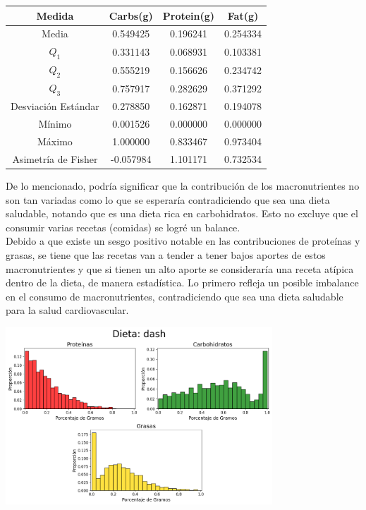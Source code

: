 \documentclass[12pt,a4paper]{article}
\begin{document}
            \begin{center}
                \begin{tabular}{| c | c c c |}
                    \toprule
                    Medida & Carbs(g) & Protein(g) & Fat(g) \\
                    \midrule
                    Media               & 0.549425 & 0.196241 & 0.254334  \\
                    $Q_1$               & 0.331143 & 0.068931 & 0.103381  \\
                    $Q_2$               & 0.555219 & 0.156626 & 0.234742  \\
                    $Q_3$               & 0.757917 & 0.282629 &	0.371292  \\
                    Desviación Estándar & 0.278850 & 0.162871 & 0.194078  \\
                    Mínimo              & 0.001526 & 0.000000 & 0.000000  \\
                    Máximo              & 1.000000 & 0.833467 & 0.973404  \\
                    Asimetría de Fisher & -0.057984 & 1.101171 & 0.732534  \\
                    \bottomrule
                \end{tabular}
            \end{center}

            De lo mencionado, podría significar que la contribución de los macronutrientes 
            no son tan variadas como lo que se esperaría contradiciendo que sea una 
            dieta saludable, notando que es una dieta rica en carbohidratos. Esto no 
            excluye que el consumir varias recetas (comidas) se logré un balance.\\

            Debido a que existe un sesgo positivo notable en las contribuciones de 
            proteínas y grasas, se tiene que las recetas van a tender a tener bajos 
            aportes de estos macronutrientes y que si tienen un alto aporte se 
            consideraría una receta atípica dentro de la dieta, de manera estadística. 
            Lo primero refleja un posible imbalance en el consumo de macronutrientes, 
            contradiciendo que sea una dieta saludable para la salud cardiovascular.

            \begin{center}
                \includegraphics[width=0.75\textwidth]{Resources/2_03_plot_01.png}
            \end{center}
\end{document}
